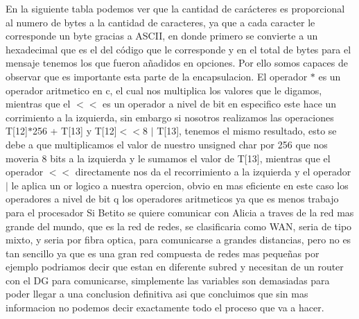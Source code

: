 \vskip 1pt
	En la siguiente tabla podemos ver que la cantidad de car\'acteres es proporcional al numero de bytes a la cantidad de caracteres, ya que a cada caracter le corresponde un byte gracias a ASCII, en donde primero se convierte a un hexadecimal que es el del c\'odigo que le corresponde y en el total de bytes para el mensaje tenemos los que fueron a\~nadidos en opciones. Por ello somos capaces de observar que es importante esta parte de la encapsulacion.
	\vskip 1pt
		El operador $*$ es un operador aritmetico en c, el cual nos multiplica los valores que le digamos, mientras que el $<$$<$ es un operador a nivel de bit en especifico este hace un corrimiento a la izquierda, sin embargo si nosotros realizamos las operaciones T[12]$*$256 + T[13] y T[12]$<$$<$8 $|$ T[13], tenemos el mismo resultado, esto se debe a que multiplicamos el valor de nuestro unsigned char por 256 que nos moveria 8 bits a la izquierda y le sumamos el valor de T[13], mientras que el operador $<$$<$ directamente nos da el recorrimiento a la izquierda y el operador $|$ le aplica un or logico a nuestra opercion, obvio en mas eficiente en este caso los operadores a nivel de bit q los operadores aritmeticos ya que es menos trabajo para el procesador
	\vskip 1pt
	Si Betito se quiere comunicar con Alicia a traves de la red mas grande del mundo, que es la red de redes, se clasificaria como WAN, seria de tipo mixto, y seria por fibra optica, para comunicarse a grandes distancias, pero no es tan sencillo ya que es una gran red compuesta de redes mas peque\~nas por ejemplo podriamos decir que estan en diferente subred y necesitan de un router con el DG para comunicarse, simplemente las variables son demasiadas para poder llegar a una conclusion definitiva asi que concluimos que sin mas informacion no podemos decir exactamente todo el proceso que va a hacer.